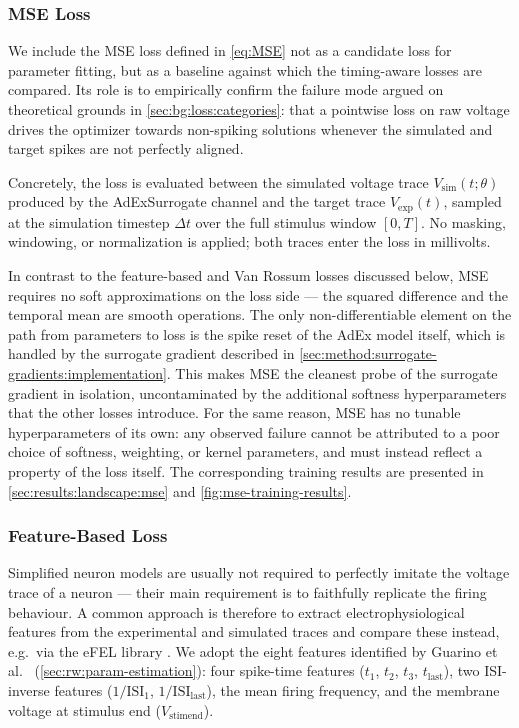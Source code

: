 \subsubsection{MSE Loss}\label{sec:method:opt:loss:mse-loss}
We include the \gls{MSE} loss defined in \cref{eq:MSE} not as a candidate loss for parameter fitting,
but as a baseline against which the timing-aware losses are compared.
Its role is to empirically confirm the failure mode argued on theoretical grounds in \cref{sec:bg:loss:categories}:
that a pointwise loss on raw voltage drives the optimizer towards non-spiking solutions whenever the simulated and target spikes are not perfectly aligned.

Concretely, the loss is evaluated between the simulated voltage trace $V_{\text{sim}}(t; \theta)$ produced by the AdExSurrogate channel and the target trace $V_{\text{exp}}(t)$,
sampled at the simulation timestep $\Delta t$ over the full stimulus window $[0, T]$.
No masking, windowing, or normalization is applied; both traces enter the loss in millivolts.

In contrast to the feature-based and Van Rossum losses discussed below, \gls{MSE} requires no soft approximations on the loss side ---
the squared difference and the temporal mean are smooth operations.
The only non-differentiable element on the path from parameters to loss is the spike reset of the AdEx model itself,
which is handled by the surrogate gradient described in \cref{sec:method:surrogate-gradients:implementation}.
This makes \gls{MSE} the cleanest probe of the surrogate gradient in isolation,
uncontaminated by the additional softness hyperparameters that the other losses introduce.
For the same reason, \gls{MSE} has no tunable hyperparameters of its own:
any observed failure cannot be attributed to a poor choice of softness, weighting, or kernel parameters,
and must instead reflect a property of the loss itself.
The corresponding training results are presented in \cref{sec:results:landscape:mse} and \cref{fig:mse-training-results}.

\subsubsection{Feature-Based Loss}\label{sec:method:opt:loss:feature-loss}
Simplified neuron models are usually not required to perfectly imitate the voltage trace of a neuron --- their main requirement is to faithfully replicate the firing behaviour.
A common approach is therefore to extract electrophysiological features from the experimental and simulated traces and compare these instead, e.g.\ via the eFEL library \cite{VanGeit2024}.
We adopt the eight features identified by Guarino et al.~\cite{Guarino2025} (\cref{sec:rw:param-estimation}): four spike-time features ($t_1$, $t_2$, $t_3$, $t_{\text{last}}$), two ISI-inverse features ($1/\text{ISI}_1$, $1/\text{ISI}_{\text{last}}$), the mean firing frequency, and the membrane voltage at stimulus end ($V_{\text{stimend}}$).

